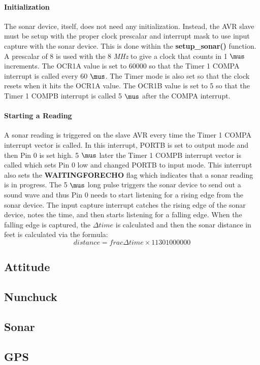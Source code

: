 \paragraph{Initialization}
The sonar device, itself, does not need any initialization.  Instead, the AVR slave must be setup with the proper clock prescalar and interrupt mask to use input capture with the sonar device.  This is done within the {\bf setup_sonar()} function.  A prescalar of 8 is used with the 8 {\it MHz} to give a clock that counts in 1 $\mus$ increments.  The OCR1A value is set to 60000 so that the Timer 1 COMPA interrupt is called every 60 $\mus$.  The Timer mode is also set so that the clock resets when it hits the OCR1A value.  The OCR1B value is set to 5 so that the Timer 1 COMPB interrupt is called 5 $\mus$ after the COMPA interrupt.

\paragraph{Starting a Reading}
A sonar reading is triggered on the slave AVR every time the Timer 1 COMPA interrupt vector is called.  In this interrupt, PORTB is set to output mode and then Pin 0 is set high.  5 $\mus$ later the Timer 1 COMPB interrupt vector is called which sets Pin 0 low and changed PORTB to input mode.  This interrupt also sets the {\bf WAITINGFORECHO} flag which indicates that a sonar reading is in progress.  The 5 $\mus$ long pulse triggers the sonar device to send out a sound wave and thus Pin 0 needs to start listening for a rising edge from the sonar device.  The input capture interrupt catches the rising edge of the sonar device, notes the time, and then starts listening for a falling edge.  When the falling edge is captured, the $\Delta time$ is calculated and then the sonar distance in feet is calculated via the formula:
\begin{equation}
distance = frac{\Delta time \times 1130}{1000000}
\end{equation}



\subsection{Attitude \label{Together}}
\subsection{Nunchuck\label{Nun}}
\subsection{Sonar\label{Sonar}}
\subsection{GPS}
\subsection{}

